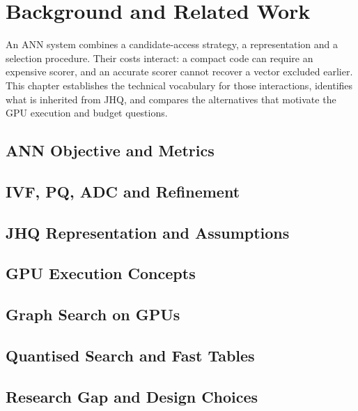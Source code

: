 \chapter{Background and Related Work}
\label{ch:background}
An ANN system combines a candidate-access strategy, a representation and a
selection procedure. Their costs interact: a compact code can require an
expensive scorer, and an accurate scorer cannot recover a vector excluded
earlier. This chapter establishes the technical vocabulary for those
interactions, identifies what is inherited from JHQ, and compares the
alternatives that motivate the GPU execution and budget questions.

\section{ANN Objective and Metrics}
\label{sec:2-1}


\section{IVF, PQ, ADC and Refinement}
\label{sec:2-2}


\section{JHQ Representation and Assumptions}
\label{sec:2-3}


\section{GPU Execution Concepts}
\label{sec:2-4}


\section{Graph Search on GPUs}
\label{sec:2-5}


\section{Quantised Search and Fast Tables}
\label{sec:2-6}


\section{Research Gap and Design Choices}
\label{sec:2-7}

